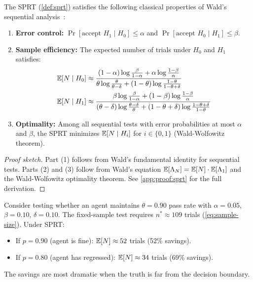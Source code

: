 \begin{proposition}
\label{thm:sprt}
The SPRT (\cref{def:sprt}) satisfies the following classical properties
of Wald's sequential analysis~\citep{wald1947sequential}:
\begin{enumerate}[leftmargin=*]
  \item \textbf{Error control:} $\Pr[\text{accept } H_1 \mid H_0] \leq \alpha$
    and $\Pr[\text{accept } H_0 \mid H_1] \leq \beta$.
  \item \textbf{Sample efficiency:} The expected number of trials under
    $H_0$ and $H_1$ satisfies:
    \begin{align}
    \label{eq:sprt-h0}
      \mathbb{E}[N \mid H_0] &\approx
        \frac{(1-\alpha)\log\frac{\beta}{1-\alpha} +
              \alpha\log\frac{1-\beta}{\alpha}}
             {\theta\log\frac{\theta}{\theta-\delta} +
              (1-\theta)\log\frac{1-\theta}{1-\theta+\delta}} \\
    \label{eq:sprt-h1}
      \mathbb{E}[N \mid H_1] &\approx
        \frac{\beta\log\frac{\beta}{1-\alpha} +
              (1-\beta)\log\frac{1-\beta}{\alpha}}
             {(\theta-\delta)\log\frac{\theta-\delta}{\theta} +
              (1-\theta+\delta)\log\frac{1-\theta+\delta}{1-\theta}}
    \end{align}
  \item \textbf{Optimality:} Among all sequential tests with error
    probabilities at most $\alpha$ and $\beta$, the SPRT minimizes
    $\mathbb{E}[N \mid H_i]$ for $i \in \{0, 1\}$ (Wald-Wolfowitz theorem).
\end{enumerate}
\end{proposition}

\begin{proof}[Proof sketch]
Part (1) follows from Wald's fundamental identity for sequential tests.
Parts (2) and (3) follow from Wald's equation
$\mathbb{E}[\Lambda_N] = \mathbb{E}[N] \cdot \mathbb{E}[\Lambda_1]$ and the Wald-Wolfowitz
optimality theorem. See \cref{app:proof:sprt} for the full derivation.
\end{proof}

\begin{example}
\label{ex:sprt-savings}
Consider testing whether an agent maintains $\theta = 0.90$ pass rate
with $\alpha = 0.05$, $\beta = 0.10$, $\delta = 0.10$. The fixed-sample
test requires $n^* \approx 109$ trials (\cref{eq:sample-size}). Under
SPRT:
\begin{itemize}[leftmargin=*]
  \item If $p = 0.90$ (agent is fine): $\mathbb{E}[N] \approx 52$ trials
    (52\% savings).
  \item If $p = 0.80$ (agent has regressed): $\mathbb{E}[N] \approx 34$ trials
    (69\% savings).
\end{itemize}
The savings are most dramatic when the truth is far from the decision
boundary.
\end{example}

